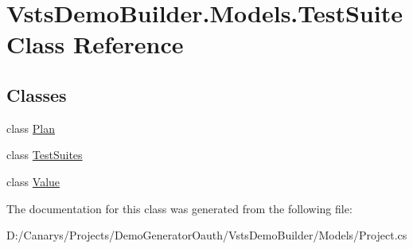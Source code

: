 \hypertarget{class_vsts_demo_builder_1_1_models_1_1_test_suite}{}\section{Vsts\+Demo\+Builder.\+Models.\+Test\+Suite Class Reference}
\label{class_vsts_demo_builder_1_1_models_1_1_test_suite}
\subsection*{Classes}
\begin{DoxyCompactItemize}
\item 
class \mbox{\hyperlink{class_vsts_demo_builder_1_1_models_1_1_test_suite_1_1_plan}{Plan}}
\item 
class \mbox{\hyperlink{class_vsts_demo_builder_1_1_models_1_1_test_suite_1_1_test_suites}{Test\+Suites}}
\item 
class \mbox{\hyperlink{class_vsts_demo_builder_1_1_models_1_1_test_suite_1_1_value}{Value}}
\end{DoxyCompactItemize}


The documentation for this class was generated from the following file\+:\begin{DoxyCompactItemize}
\item 
D\+:/\+Canarys/\+Projects/\+Demo\+Generator\+Oauth/\+Vsts\+Demo\+Builder/\+Models/Project.\+cs\end{DoxyCompactItemize}
